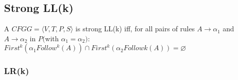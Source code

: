 \subsection{Strong LL(k)}    
A $CFG G= \langle V ,T ,P,S \rangle $ is strong LL(k) 
iff, for all pairs of rules $A→ \alpha_1$ and $A→ \alpha_2$ in $P ($with $\alpha_1 = \alpha_2)$:
$First^k ( \alpha_1 Follow^k (A) ) \cap First^k (\alpha_2 Followk (A) ) = \varnothing $



\subsubsection{LR(k)}











